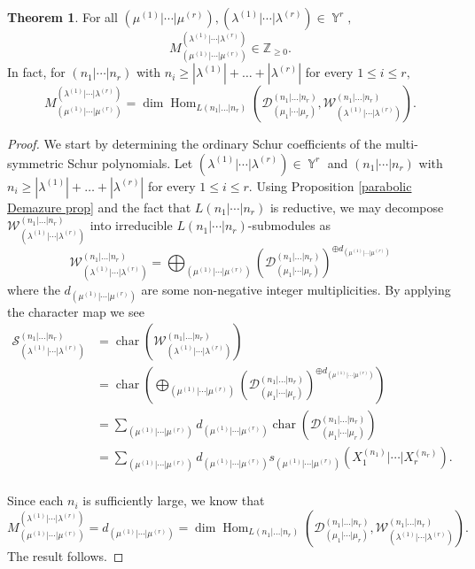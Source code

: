 \documentclass[12pt,reqno]{amsart}
\theoremstyle{definition}
\newtheorem{thm}{Theorem}[section]
\DeclareMathOperator{\Par}{\mathbb{Y}}
\DeclareMathOperator{\Hom}{\mathrm{Hom}}
\DeclareMathOperator{\Char}{\mathrm{char}}
\DeclareMathOperator{\cS}{\mathcal{S}}
\begin{document}
\begin{thm} \label{Schur positivity theorem} 
 For all $(\mu^{(1)}|\cdots | \mu^{(r)}),(\lambda^{(1)}|\cdots | \lambda^{(r)}) \in \Par^r,$ $$M_{(\mu^{(1)}|\cdots | \mu^{(r)})}^{(\lambda^{(1)}|\cdots | \lambda^{(r)})} \in \mathbb{Z}_{\geq 0}.$$ In fact, for $(n_1|\cdots |n_r)$ with $n_i \geq |\lambda^{(1)}|+\ldots + |\lambda^{(r)}|$ for every $1\leq i \leq r,$ $$ M_{(\mu^{(1)}|\cdots | \mu^{(r)})}^{(\lambda^{(1)}|\cdots | \lambda^{(r)})} =  \dim \Hom_{L(n_1|\ldots|n_r)}(\mathcal{D}^{(n_1|\ldots|n_r)}_{(\mu_1|\cdots|\mu_r)}, \mathcal{W}_{(\lambda^{(1)}|\cdots| \lambda^{(r)})}^{(n_1|\ldots|n_r)} ).$$ 
\end{thm}
\begin{proof}
We start by determining the ordinary Schur coefficients of the multi-symmetric Schur polynomials. Let $(\lambda^{(1)}|\cdots | \lambda^{(r)}) \in \Par^r$ and  $(n_1|\cdots |n_r)$ with $n_i \geq |\lambda^{(1)}|+\ldots + |\lambda^{(r)}|$ for every $1\leq i \leq r.$ Using Proposition \ref{parabolic Demazure prop} and the fact that $L(n_1|\cdots|n_r)$ is reductive, we may decompose $\mathcal{W}_{(\lambda^{(1)}|\cdots | \lambda^{(r)})}^{(n_1|\ldots|n_r)}$ into irreducible $L(n_1|\cdots|n_r)$-submodules as 
$$\mathcal{W}_{(\lambda^{(1)}|\cdots | \lambda^{(r)})}^{(n_1|\ldots|n_r)} = \bigoplus_{(\mu^{(1)}|\cdots | \mu^{(r)})} \left( \mathcal{D}^{(n_1|\ldots|n_r)}_{(\mu_1|\cdots|\mu_r)}  \right) ^{\oplus d_{(\mu^{(1)}|\cdots | \mu^{(r)})}}$$ where the $d_{(\mu^{(1)}|\cdots | \mu^{(r)})}$ are some non-negative integer multiplicities.
By applying the character map we see
    \begin{align*}
        \cS_{(\lambda^{(1)}|\cdots | \lambda^{(r)})}^{(n_1|\ldots|n_r)} &= \Char(\mathcal{W}_{(\lambda^{(1)}|\cdots | \lambda^{(r)})}^{(n_1|\ldots|n_r)}) \\
        &= \Char \left( \bigoplus_{(\mu^{(1)}|\cdots | \mu^{(r)})} \left( \mathcal{D}^{(n_1|\ldots|n_r)}_{(\mu_1|\cdots|\mu_r)}  \right) ^{\oplus d_{(\mu^{(1)}|\cdots | \mu^{(r)})}}\right)\\ 
        &= \sum_{(\mu^{(1)}|\cdots | \mu^{(r)})} d_{(\mu^{(1)}|\cdots | \mu^{(r)})} \Char\left( \mathcal{D}^{(n_1|\ldots|n_r)}_{(\mu_1|\cdots|\mu_r)}  \right) \\
        &= \sum_{(\mu^{(1)}|\cdots | \mu^{(r)})} d_{(\mu^{(1)}|\cdots | \mu^{(r)})} s_{(\mu^{(1)}|\cdots|\mu^{(r)})}(X_1^{(n_1)}|\cdots |X_{r}^{(n_r)}).\\
    \end{align*}

   Since each $n_i$ is sufficiently large, we know that 
$$ M_{(\mu^{(1)}|\cdots | \mu^{(r)})}^{(\lambda^{(1)}|\cdots | \lambda^{(r)})} = d_{(\mu^{(1)}|\cdots | \mu^{(r)})} =   \dim \Hom_{L(n_1|\ldots|n_r)}(\mathcal{D}^{(n_1|\ldots|n_r)}_{(\mu_1|\cdots|\mu_r)}, \mathcal{W}_{(\lambda^{(1)}|\cdots| \lambda^{(r)})}^{(n_1|\ldots|n_r)} ).$$ The result follows. 
\end{proof}
\end{document}

